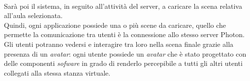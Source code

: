 \\Sarà poi il sistema, in seguito all'attività del server, a caricare la scena relativa all'aula selezionata.
\\Quindi, ogni applicazione possiede una o più scene da caricare, quello che permette la comunicazione tra utenti è la connessione allo stesso server Photon.
\\Gli utenti potranno vedersi e interagire tra loro nella scena finale grazie alla presenza di un \textit{avatar}: ogni utente possiede un \textit{avatar} che è stato progettato con delle componenti \textit{sofware} in grado di renderlo percepibile a tutti gli altri utenti collegati alla stessa stanza virtuale.